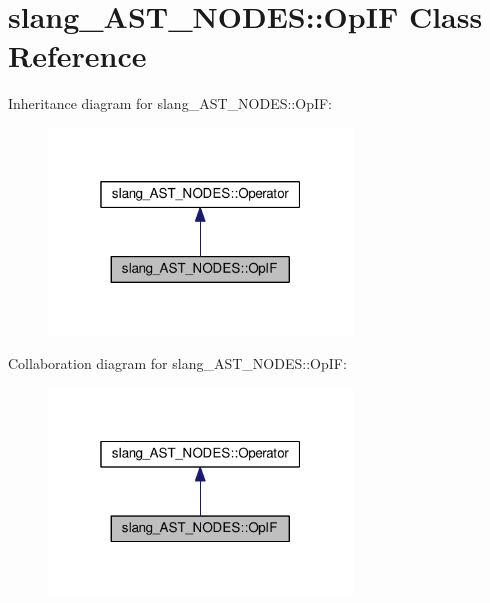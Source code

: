 \hypertarget{classslang__AST__NODES_1_1OpIF}{}\section{slang\+\_\+\+A\+S\+T\+\_\+\+N\+O\+D\+ES\+:\+:Op\+IF Class Reference}
\label{classslang__AST__NODES_1_1OpIF}


Inheritance diagram for slang\+\_\+\+A\+S\+T\+\_\+\+N\+O\+D\+ES\+:\+:Op\+IF\+:
\nopagebreak
\begin{figure}[H]
\begin{center}
\leavevmode
\includegraphics[width=229pt]{classslang__AST__NODES_1_1OpIF__inherit__graph}
\end{center}
\end{figure}


Collaboration diagram for slang\+\_\+\+A\+S\+T\+\_\+\+N\+O\+D\+ES\+:\+:Op\+IF\+:
\nopagebreak
\begin{figure}[H]
\begin{center}
\leavevmode
\includegraphics[width=229pt]{classslang__AST__NODES_1_1OpIF__coll__graph}
\end{center}
\end{figure}
